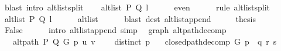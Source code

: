 \begin{isabellebody}
\ {\isacharparenleft}{\kern0pt}blast\ intro{\isacharcolon}{\kern0pt}\ alt{\isacharunderscore}{\kern0pt}list{\isacharunderscore}{\kern0pt}split{\isacharunderscore}{\kern0pt}{}{\isacharparenright}{\kern0pt}\isanewline
\ \ \isamarkupfalse%
\ {\isachardoublequoteopen}alt{\isacharunderscore}{\kern0pt}list\ P\ Q\ l{}{\isachardoublequoteclose}\isanewline
\ \ \ \ \isamarkupfalse%
\ even\isanewline
\ \ \ \ \isamarkupfalse%
\ {\isacharparenleft}{\kern0pt}rule\ alt{\isacharunderscore}{\kern0pt}list{\isacharunderscore}{\kern0pt}split{\isacharunderscore}{\kern0pt}{}{\isacharparenright}{\kern0pt}\isanewline
\ \ \isamarkupfalse%
\ \isamarkupfalse%
\ {\isachardoublequoteopen}alt{\isacharunderscore}{\kern0pt}list\ P\ Q\ l{}{\isachardoublequoteclose}\isanewline
\ \ \ \ \isamarkupfalse%
\ alt{\isacharunderscore}{\kern0pt}list\isanewline
\ \ \ \ \isamarkupfalse%
\ {\isacharparenleft}{\kern0pt}blast\ dest{\isacharcolon}{\kern0pt}\ alt{\isacharunderscore}{\kern0pt}list{\isacharunderscore}{\kern0pt}append{\isacharunderscore}{\kern0pt}{}{\isacharparenright}{\kern0pt}\isanewline
\ \ \isamarkupfalse%
\ \isamarkupfalse%
\ {\isacharquery}{\kern0pt}thesis\isanewline
\ \ \ \ \isamarkupfalse%
\ False\isanewline
\ \ \ \ \isamarkupfalse%
\ {\isacharparenleft}{\kern0pt}intro\ alt{\isacharunderscore}{\kern0pt}list{\isacharunderscore}{\kern0pt}append{\isacharunderscore}{\kern0pt}{}{\isacharparenright}{\kern0pt}\ simp{\isacharplus}{\kern0pt}\isanewline
{}\isamarkupfalse%
%
\endisatagproof
{\isafoldproof}%
%
\isadelimproof
\isanewline
%
\endisadelimproof
%
\isadeliminvisible
\isanewline
%
\endisadeliminvisible
%
\isataginvisible
{}\isamarkupfalse%
\ {\isacharparenleft}{\kern0pt}\ graph{\isacharparenright}{\kern0pt}\ alt{\isacharunderscore}{\kern0pt}path{\isacharunderscore}{\kern0pt}decomp{\isacharcolon}{\kern0pt}\isanewline
\ \ \ {\isachardoublequoteopen}alt{\isacharunderscore}{\kern0pt}path\ P\ Q\ G\ p\ u\ v{\isachardoublequoteclose}\isanewline
\ \ \ {\isachardoublequoteopen}{\isasymnot}\ distinct\ p{\isachardoublequoteclose}\isanewline
\ \ \ {\isachardoublequoteopen}closed{\isacharunderscore}{\kern0pt}path{\isacharunderscore}{\kern0pt}decomp\ G\ p\ {\isacharequal}{\kern0pt}\ {\isacharparenleft}{\kern0pt}q{\isacharcomma}{\kern0pt}\ r{\isacharcomma}{\kern0pt}\ s{\isacharparenright}{\kern0pt}{\isachardoublequoteclose}\isanewline

\end{isabellebody}
